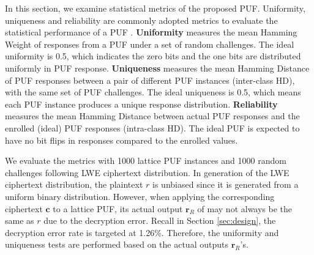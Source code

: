 

In this section, we examine statistical metrics of the proposed PUF. 
Uniformity, uniqueness and reliability are commonly adopted metrics to evaluate the statistical performance of a PUF \cite{maiti2013systematic}. 
\textbf{Uniformity} measures the mean Hamming Weight of responses from a PUF under a set of random challenges. 
The ideal uniformity is 0.5, which indicates the zero bits and the one bits are distributed uniformly in PUF response. 
\textbf{Uniqueness} measures the mean Hamming Distance of PUF responses between a pair of different PUF instances (inter-class HD), with the same set of PUF challenges. 
The ideal uniqueness is 0.5, which means each PUF instance produces a unique response distribution. \textbf{Reliability} measures the mean Hamming Distance between actual PUF responses and the enrolled (ideal) PUF responses (intra-class HD). 
The ideal PUF is expected to have no bit flips in responses compared to the enrolled values.

We evaluate the metrics with 1000 lattice PUF instances and 1000 random challenges following LWE ciphertext distribution. 
In generation of the LWE ciphertext distribution, the plaintext $r$ is unbiased since it is generated from a uniform binary distribution. 
However, when applying the corresponding ciphertext $\mathbf{c}$ to a lattice PUF, its actual output $\mathbf{r}_R$ of may not always be the same as $r$ due to the decryption error. 
Recall in Section \ref{sec:design}, the decryption error rate is targeted at 1.26\%. 
Therefore, the uniformity and uniqueness tests are performed based on the actual outputs $\mathbf{r}_R$'s.

